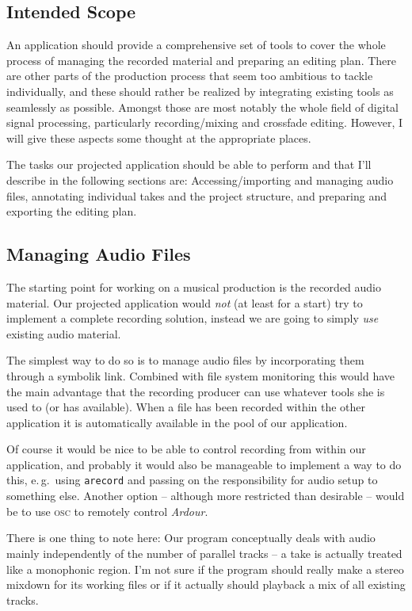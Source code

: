 \documentclass[11pt,a4paper]{article}
\begin{document}
\subsection{Intended Scope}

An application should provide a comprehensive set of tools to cover the whole
process of managing the recorded material and preparing an editing plan.
There are other parts of the production process that seem too ambitious to
tackle individually, and these should rather be realized by integrating existing
tools as seamlessly as possible.
Amongst those are most notably the whole field of digital signal processing,
particularly recording/mixing and crossfade editing.
However, I will give these aspects some thought at the appropriate places.

The tasks our projected application should be able to perform and that I'll
describe in the following sections are:
Accessing/importing and managing audio files,
annotating individual takes and the project structure, and
preparing and exporting the editing plan.

\subsection{Managing Audio Files}

The starting point for working on a musical production is the recorded audio
material.
Our projected application would \emph{not} (at least for a start) try to
implement a complete recording solution, instead we are going to simply
\emph{use} existing audio material.

The simplest way to do so is to manage audio files by incorporating them through
a symbolik link.
Combined with file system monitoring this would have the main advantage that the
recording producer can use whatever tools she is used to (or has available).
When a file has been recorded within the other application it is automatically
available in the pool of our application.

Of course it would be nice to be able to control recording from within our
application, and probably it would also be manageable to implement a way to do
this, e.\,g.\ using \texttt{arecord} and passing on the responsibility for audio
setup to something else.
Another option -- although more restricted than desirable -- would be to use
\textsc{osc} to remotely control \emph{Ardour}.

There is one thing to note here: Our program conceptually deals with audio
mainly independently of the number of parallel tracks -- a take is actually treated like
a monophonic region.
I'm not sure if the program should really make a stereo mixdown for its working
files or if it actually should playback a mix of all existing tracks.
\end{document}
